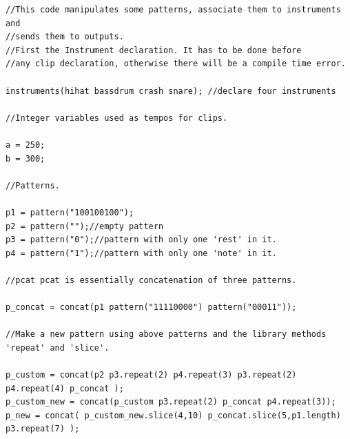 \documentclass[11pt,twoside]{article}
\begin{document}
\begin{verbatim}
//This code manipulates some patterns, associate them to instruments and
//sends them to outputs.
//First the Instrument declaration. It has to be done before 
//any clip declaration, otherwise there will be a compile time error.

instruments(hihat bassdrum crash snare); //declare four instruments

//Integer variables used as tempos for clips.

a = 250;
b = 300;

//Patterns.

p1 = pattern("100100100");
p2 = pattern("");//empty pattern
p3 = pattern("0");//pattern with only one 'rest' in it.
p4 = pattern("1");//pattern with only one 'note' in it.

//pcat pcat is essentially concatenation of three patterns.

p_concat = concat(p1 pattern("11110000") pattern("00011"));

//Make a new pattern using above patterns and the library methods 'repeat' and 'slice'. 

p_custom = concat(p2 p3.repeat(2) p4.repeat(3) p3.repeat(2) p4.repeat(4) p_concat );
p_custom_new = concat(p_custom p3.repeat(2) p_concat p4.repeat(3));
p_new = concat( p_custom_new.slice(4,10) p_concat.slice(5,p1.length) p3.repeat(7) );

\end{verbatim}
\clearpage
\end{document}
